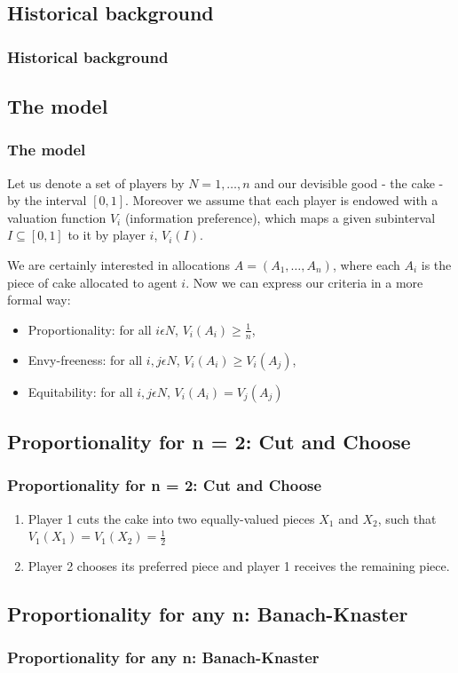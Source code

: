 \documentclass{beamer}
\begin{document}
\subsection{Historical background}
\begin{frame}
\frametitle{Historical background}
\end{frame}


\subsection{The model}
\begin{frame}
\frametitle{The model}
    Let us denote a set of players by $N={1,\dots,n}$ and our devisible good - the cake - by the interval $[0,1]$. Moreover we assume that each player is endowed with a valuation function $V_{i}$ (information preference), which maps a given subinterval $I\subseteq[0,1]$ to it by player $i$, $V_{i}(I)$. 

    We are certainly interested in allocations $A=(A_1,\dots,A_n)$, where each $A_i$ is the piece of cake allocated to agent $i$. Now we can express our criteria in a more formal way:
\begin{itemize}
    \item Proportionality: for all $i\epsilon{N}$, $V_{i}(A_i)\geq\frac{1}{n}$,
    \item Envy-freeness: for all $i,j\epsilon{N}$, $V_{i}(A_i)\geq{V_i}(A_j)$,
    \item Equitability: for all $i,j\epsilon{N}$, $V_{i}(A_i)={V_j}(A_j)$
\end{itemize}
\end{frame}


\subsection{Proportionality for n = 2: Cut and Choose}
\begin{frame}
\frametitle{Proportionality for n = 2: Cut and Choose}
\begin{enumerate}
    \item Player 1 cuts the cake into two equally-valued pieces $X_1$ and $X_2$, such that $V_1(X_1)=V_1(X_2)=\frac{1}{2}$
    \item Player 2 chooses its preferred piece and player 1 receives the remaining piece.
\end{enumerate}
\end{frame}

\subsection{Proportionality for any n: Banach-Knaster}
\begin{frame}
\frametitle{Proportionality for any n: Banach-Knaster}

\end{frame}
\end{document}
